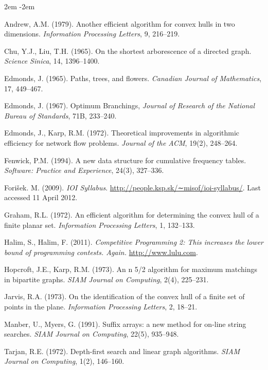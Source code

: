 






\begin{chatext}
{
\leftskip 2em
\parindent -2em

Andrew, A.M. (1979). Another efficient algorithm for convex hulls in two dimensions. \textit{Information Processing Letters}, 9, 216–219.

Chu, Y.J., Liu, T.H. (1965). On the shortest arborescence of a directed graph. \textit{Science Sinica}, 14, 1396–1400.

Edmonds, J. (1965). Paths, trees, and flowers. \textit{Canadian Journal of Mathematics}, 17, 449–467.

Edmonds, J. (1967). Optimum Branchings, \textit{Journal of Research of the National Bureau of Standards}, 71B, 233–240.

Edmonds, J., Karp, R.M. (1972). Theoretical improvements in algorithmic efficiency for network flow problems. \textit{Journal of the ACM}, 19(2), 248–264.

Fenwick, P.M. (1994). A new data structure for cumulative frequency tables. \textit{Software: Practice and Experience}, 24(3), 327–336.

Forišek. M. (2009). \textit{IOI Syllabus}. \url{http://people.ksp.sk/∼misof/ioi-syllabus/}. Last accessed 11 April 2012.

Graham, R.L. (1972). An efficient algorithm for determining the convex hull of a finite planar set. \textit{Information Processing Letters}, 1, 132–133.

Halim, S., Halim, F. (2011). \textit{Competitive Programming 2: This increases the lower bound of programming contests. Again.} \url{http://www.lulu.com}.

Hopcroft, J.E., Karp, R.M. (1973). An n 5/2 algorithm for maximum matchings in bipartite graphs. \textit{SIAM Journal on Computing}, 2(4), 225–231.

Jarvis, R.A. (1973). On the identification of the convex hull of a finite set of points in the plane. \textit{Information Processing Letters}, 2, 18–21.

Manber, U., Myers, G. (1991). Suffix arrays: a new method for on-line string searches. \textit{SIAM Journal on Computing}, 22(5), 935–948.

Tarjan, R.E. (1972). Depth-first search and linear graph algorithms. \textit{SIAM Journal on Computing}, 1(2), 146–160.

}
\end{chatext}
